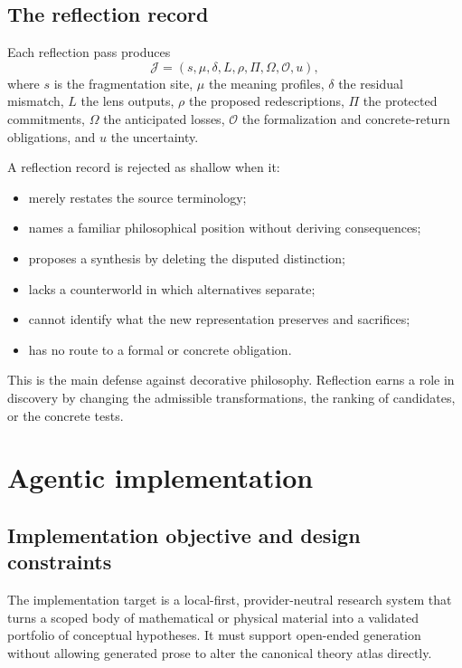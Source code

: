 \documentclass[11pt]{article}
\begin{document}
\subsection{The reflection record}

Each reflection pass produces
\begin{equation}
\mathcal{J}=
(s,\mu,\delta,L,\rho,\Pi,\Omega,\mathcal{O},u),
\end{equation}
where $s$ is the fragmentation site, $\mu$ the meaning profiles, $\delta$ the residual mismatch, $L$
the lens outputs, $\rho$ the proposed redescriptions, $\Pi$ the protected commitments, $\Omega$ the
anticipated losses, $\mathcal{O}$ the formalization and concrete-return obligations, and $u$ the
uncertainty.

A reflection record is rejected as shallow when it:
\begin{itemize}
  \item merely restates the source terminology;
  \item names a familiar philosophical position without deriving consequences;
  \item proposes a synthesis by deleting the disputed distinction;
  \item lacks a counterworld in which alternatives separate;
  \item cannot identify what the new representation preserves and sacrifices;
  \item has no route to a formal or concrete obligation.
\end{itemize}

This is the main defense against decorative philosophy. Reflection earns a role in discovery by
changing the admissible transformations, the ranking of candidates, or the concrete tests.

\section{Agentic implementation}

\subsection{Implementation objective and design constraints}

The implementation target is a local-first, provider-neutral research system that turns a scoped body
of mathematical or physical material into a validated portfolio of conceptual hypotheses. It must
support open-ended generation without allowing generated prose to alter the canonical theory atlas
directly.
\end{document}
